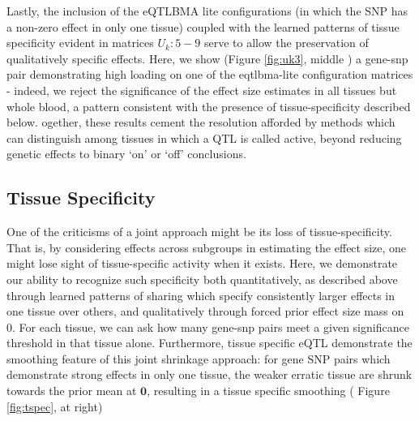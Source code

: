 Lastly, the inclusion of the eQTLBMA lite configurations (in which the SNP has a non-zero effect in only one tissue) coupled with the learned patterns of tissue specificity evident in matrices $U_{k}: 5-9$ serve to allow the preservation of qualitatively specific effects. Here, we show (Figure \ref{fig:uk3}, middle ) a gene-snp pair demonstrating high loading on one of the eqtlbma-lite configuration matrices - indeed, we reject the significance of the effect size estimates in all tissues but whole blood,  a pattern consistent with the presence of tissue-specificity described below. ogether, these results cement the resolution afforded by methods which can distinguish among tissues in which a QTL is called active, beyond reducing genetic effects to binary `on' or `off' conclusions.%


\subsection{Tissue Specificity}

One of the criticisms of a joint approach might be its loss of tissue-specificity. That is, by considering effects across subgroups in estimating the effect size, one might lose sight of tissue-specific activity when it exists. Here, we demonstrate our ability to recognize such specificity both quantitatively, as described above through learned patterns of sharing which specify consistently larger effects in one tissue over others, and qualitatively through forced prior effect size mass on 0.  For each tissue, we can ask how many gene-snp pairs meet a given significance threshold in that tissue alone. Furthermore, tissue specific eQTL demonstrate the smoothing feature of this joint shrinkage approach: for gene SNP pairs which demonstrate strong effects in only one tissue, the weaker erratic tissue are shrunk towards the prior mean at $\bm{0}$, resulting in a tissue specific smoothing ( Figure \ref{fig:tspec}, at right) \newline



